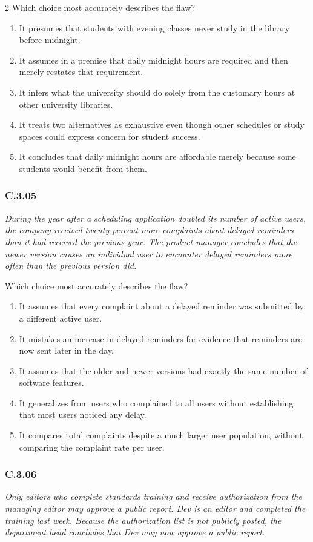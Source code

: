 \documentclass[10pt]{extarticle}
\newcommand{\choice}[1]{\item #1}
\newcommand{\bankitem}[1]{\subsubsection*{#1}}
\begin{document}
\begin{multicols}{2}
Which choice most accurately describes the flaw?
\begin{enumerate}[label=(\alph*)]
  \choice{It presumes that students with evening classes never study in the library before midnight.}
  \choice{It assumes in a premise that daily midnight hours are required and then merely restates that requirement.}
  \choice{It infers what the university should do solely from the customary hours at other university libraries.}
  \choice{It treats two alternatives as exhaustive even though other schedules or study spaces could express concern for student success.}
  \choice{It concludes that daily midnight hours are affordable merely because some students would benefit from them.}
\end{enumerate}
\bankitem{C.3.05}
\emph{During the year after a scheduling application doubled its number of active users, the company received twenty percent more complaints about delayed reminders than it had received the previous year. The product manager concludes that the newer version causes an individual user to encounter delayed reminders more often than the previous version did.}

Which choice most accurately describes the flaw?
\begin{enumerate}[label=(\alph*)]
  \choice{It assumes that every complaint about a delayed reminder was submitted by a different active user.}
  \choice{It mistakes an increase in delayed reminders for evidence that reminders are now sent later in the day.}
  \choice{It assumes that the older and newer versions had exactly the same number of software features.}
  \choice{It generalizes from users who complained to all users without establishing that most users noticed any delay.}
  \choice{It compares total complaints despite a much larger user population, without comparing the complaint rate per user.}
\end{enumerate}
\bankitem{C.3.06}
\emph{Only editors who complete standards training and receive authorization from the managing editor may approve a public report. Dev is an editor and completed the training last week. Because the authorization list is not publicly posted, the department head concludes that Dev may now approve a public report.}


\end{multicols}
\end{document}
